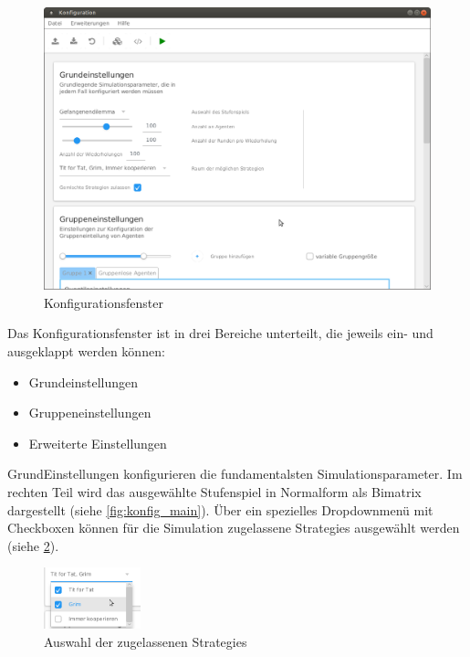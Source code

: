\documentclass[parskip=full,11pt]{scrartcl}
\begin{document}
\begin{figure}[ht]
	\centering
	\includegraphics[width=\textwidth]{images/konfig.png}
	\caption{\label{fig:konfig}
		Konfigurationsfenster}
\end{figure}

Das Konfigurationsfenster ist in drei Bereiche unterteilt, die jeweils ein- und ausgeklappt werden können:
\begin{itemize} \itemsep -10pt
	\item Grundeinstellungen
	\item Gruppeneinstellungen
	\item Erweiterte Einstellungen
\end{itemize}

GrundEinstellungen konfigurieren die fundamentalsten Simulationsparameter. Im rechten Teil wird das ausgewählte Stufenspiel in Normalform als Bimatrix dargestellt (siehe \cref{fig:konfig_main}). Über ein spezielles Dropdownmenü mit Checkboxen können für die Simulation zugelassene \Glspl{Strategie} ausgewählt werden (siehe \cref{fig:konfig_strat_detail}).

\begin{figure}[ht]
	\centering
	\includegraphics[width=0.25\textwidth]{images/konfig_strat_detail.png}
	\caption{\label{fig:konfig_strat_detail}
		Auswahl der zugelassenen \Glspl{Strategie}}
\end{figure}
\end{document}

